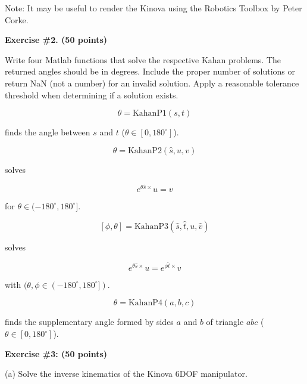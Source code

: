 \documentclass[11pt]{article}
\begin{document}
\noindent
Note: It may be useful to render the Kinova using the Robotics Toolbox by Peter
Corke.

\vspace{0.5cm}

\noindent
\textbf{Exercise \#2. (50 points)}

\vspace{0.3cm}

Write four Matlab functions that solve the respective Kahan problems. The returned
angles should be in degrees. Include the proper number of solutions or return
NaN (not a number) for an invalid solution. Apply a reasonable tolerance
threshold when determining if a solution exists.

\vspace{0.3cm}

\[
\theta = \text{KahanP1}(s,t)
\]

finds the angle between $s$ and $t$ ($\theta \in [0,180^\circ]$).

\vspace{0.3cm}

\[
\theta = \text{KahanP2}(\hat{s},u,v)
\]

solves

\[
e^{\theta \hat{s}\times} u = v
\]

for $\theta \in (-180^\circ,180^\circ]$.

\vspace{0.3cm}

\[
[\phi,\theta] = \text{KahanP3}(\hat{s},\hat{t},u,\hat{v})
\]

solves

\[
e^{\theta \hat{s}\times}u = e^{\phi \hat{t}\times}v
\]

with $(\theta,\phi \in (-180^\circ,180^\circ])$.

\vspace{0.3cm}

\[
\theta = \text{KahanP4}(a,b,c)
\]

finds the supplementary angle formed by sides $a$ and $b$ of triangle $abc$
($\theta \in [0,180^\circ]$).

\vspace{0.5cm}

\noindent
\textbf{Exercise \#3: (50 points)}

\vspace{0.3cm}

(a) Solve the inverse kinematics of the Kinova 6DOF manipulator.

\vspace{0.3cm}
\end{document}
